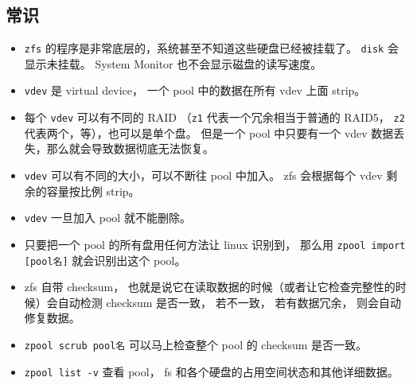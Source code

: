 \subsection{常识}
\begin{itemize}
\item \verb|zfs| 的程序是非常底层的，系统甚至不知道这些硬盘已经被挂载了。 \verb|disk| 会显示未挂载。 System Monitor 也不会显示磁盘的读写速度。
\item \verb|vdev| 是 virtual device， 一个 pool 中的数据在所有 vdev 上面 strip。
\item 每个 \verb|vdev| 可以有不同的 RAID （\verb|z1| 代表一个冗余相当于普通的 RAID5， \verb|z2| 代表两个，等），也可以是单个盘。 但是一个 pool 中只要有一个 vdev 数据丢失，那么就会导致数据彻底无法恢复。
\item \verb|vdev| 可以有不同的大小，可以不断往 pool 中加入。 zfs 会根据每个 vdev 剩余的容量按比例 strip。
\item \verb|vdev| 一旦加入 pool 就不能删除。
\item 只要把一个 pool 的所有盘用任何方法让 linux 识别到， 那么用 \verb|zpool import [pool名]| 就会识别出这个 pool。
\item zfs 自带 checksum， 也就是说它在读取数据的时候（或者让它检查完整性的时候）会自动检测 checksum 是否一致， 若不一致， 若有数据冗余， 则会自动修复数据。
\item \verb|zpool scrub pool名| 可以马上检查整个 pool 的 checksum 是否一致。
\item \verb|zpool list -v| 查看 pool， fs 和各个硬盘的占用空间状态和其他详细数据。
\end{itemize}


